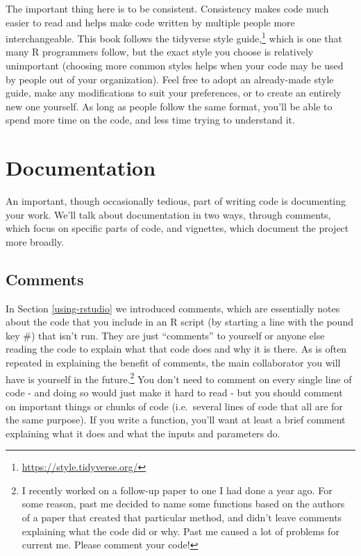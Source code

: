 \documentclass[
  a4paper,
]{krantz}
\renewcommand{\href}[2]{#2\footnote{\url{#1}}}
\begin{document}
The important thing here is to be consistent. Consistency
makes code much easier to read and helps make code written
by multiple people more interchangeable. This book follows
the \href{https://style.tidyverse.org/}{tidyverse style
guide,} which is one that many R programmers follow, but the
exact style you choose is relatively unimportant (choosing
more common styles helps when your code may be used by
people out of your organization). Feel free to adopt an
already-made style guide, make any modifications to suit
your preferences, or to create an entirely new one yourself.
As long as people follow the same format, you'll be able to
spend more time on the code, and less time trying to
understand it.

\hypertarget{documentation}{%
\section{Documentation}\label{documentation}}

An important, though occasionally tedious, part of writing
code is documenting your work. We'll talk about
documentation in two ways, through comments, which focus on
specific parts of code, and vignettes, which document the
project more broadly.

\hypertarget{comments}{%
\subsection{Comments}\label{comments}}

In Section \ref{using-rstudio} we introduced comments, which
are essentially notes about the code that you include in an
R script (by starting a line with the pound key \#) that
isn't run. They are just ``comments'' to yourself or anyone
else reading the code to explain what that code does and why
it is there. As is often repeated in explaining the benefit
of comments, the main collaborator you will have is yourself
in the future.\footnote{I recently worked on a follow-up
  paper to one I had done a year ago. For some reason, past
  me decided to name some functions based on the authors of
  a paper that created that particular method, and didn't
  leave comments explaining what the code did or why. Past
  me caused a lot of problems for current me. Please comment
  your code!} You don't need to comment on every single line
of code - and doing so would just make it hard to read - but
you should comment on important things or chunks of code
(i.e.~several lines of code that all are for the same
purpose). If you write a function, you'll want at least a
brief comment explaining what it does and what the inputs
and parameters do.
\end{document}
